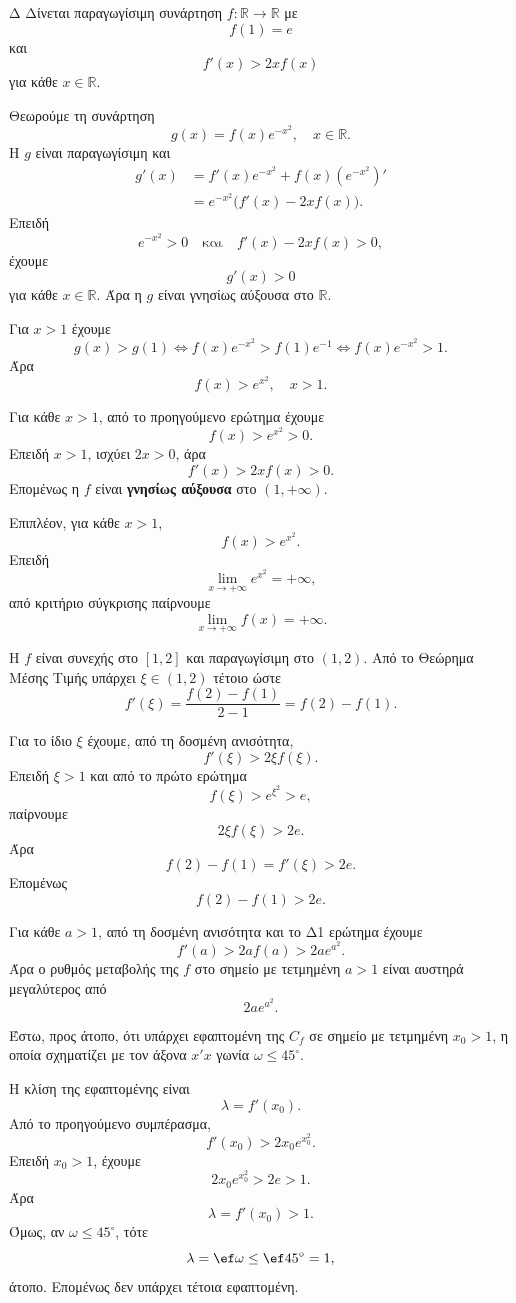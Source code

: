 \begin{thema}{Δ}
Δίνεται παραγωγίσιμη συνάρτηση $f:\mathbb{R}\to\mathbb{R}$ με
\[
f(1)=e
\]
και
\[
f'(x)>2xf(x)
\]
για κάθε $x\in\mathbb{R}$.
\begin{erwthma}
\item Θεωρούμε τη συνάρτηση
\[
g(x)=f(x)e^{-x^2},\quad x\in\mathbb{R}.
\]
Η $g$ είναι παραγωγίσιμη και
\begin{align*}
g'(x)&=f'(x)e^{-x^2}+f(x)(e^{-x^2})'\\
&=e^{-x^2}\bigl(f'(x)-2xf(x)\bigr).
\end{align*}
Επειδή
\[
e^{-x^2}>0
\quad\text{και}\quad
f'(x)-2xf(x)>0,
\]
έχουμε
\[
g'(x)>0
\]
για κάθε $x\in\mathbb{R}$. Άρα η $g$ είναι γνησίως αύξουσα στο $\mathbb{R}$.

Για $x>1$ έχουμε
\[
g(x)>g(1)
\Leftrightarrow f(x)e^{-x^2}>f(1)e^{-1}
\Leftrightarrow f(x)e^{-x^2}>1.
\]
Άρα
\[
{f(x)>e^{x^2},\quad x>1}.
\]

\item Για κάθε $x>1$, από το προηγούμενο ερώτημα έχουμε
\[
f(x)>e^{x^2}>0.
\]
Επειδή $x>1$, ισχύει $2x>0$, άρα
\[
f'(x)>2xf(x)>0.
\]
Επομένως η $f$ είναι \textbf{γνησίως αύξουσα} στο $(1,+\infty)$.

Επιπλέον, για κάθε $x>1$,
\[
f(x)>e^{x^2}.
\]
Επειδή
\[
\lim_{x\to+\infty}e^{x^2}=+\infty,
\]
από κριτήριο σύγκρισης παίρνουμε
\[
{\lim_{x\to+\infty}f(x)=+\infty}.
\]

\item Η $f$ είναι συνεχής στο $[1,2]$ και παραγωγίσιμη στο $(1,2)$. Από το Θεώρημα Μέσης Τιμής υπάρχει $\xi\in(1,2)$ τέτοιο ώστε
\[
f'(\xi)=\frac{f(2)-f(1)}{2-1}=f(2)-f(1).
\]

Για το ίδιο $\xi$ έχουμε, από τη δοσμένη ανισότητα,
\[
f'(\xi)>2\xi f(\xi).
\]
Επειδή $\xi>1$ και από το πρώτο ερώτημα
\[
f(\xi)>e^{\xi^2}>e,
\]
παίρνουμε
\[
2\xi f(\xi)>2e.
\]
Άρα
\[
f(2)-f(1)=f'(\xi)>2e.
\]
Επομένως
\[
{f(2)-f(1)>2e}.
\]

\item Για κάθε $a>1$, από τη δοσμένη ανισότητα και το Δ1 ερώτημα έχουμε
\[
f'(a)>2af(a)>2ae^{a^2}.
\]
Άρα ο ρυθμός μεταβολής της $f$ στο σημείο με τετμημένη $a>1$ είναι αυστηρά μεγαλύτερος από
\[
{2ae^{a^2}}.
\]

Έστω, προς άτοπο, ότι υπάρχει εφαπτομένη της $C_f$ σε σημείο με τετμημένη $x_0>1$, η οποία σχηματίζει με τον άξονα $x'x$ γωνία $\omega\leq45^\circ$.

Η κλίση της εφαπτομένης είναι
\[
\lambda=f'(x_0).
\]
Από το προηγούμενο συμπέρασμα,
\[
f'(x_0)>2x_0e^{x_0^2}.
\]
Επειδή $x_0>1$, έχουμε
\[
2x_0e^{x_0^2}>2e>1.
\]
Άρα
\[
\lambda=f'(x_0)>1.
\]
Όμως, αν $\omega\leq45^\circ$, τότε
\[
\lambda=\ef\omega\leq\ef45^\circ=1,
\]
άτοπο. Επομένως δεν υπάρχει τέτοια εφαπτομένη.
\end{erwthma}
\end{thema}
